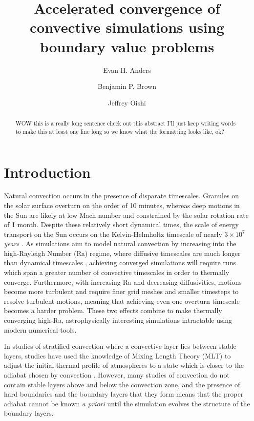 \documentclass[aps, pre, onecolumn, nofootinbib, notitlepage, groupedaddress, amsfonts, amssymb, amsmath, longbibliography]{revtex4-1}
\begin{document}
\author{Evan H. Anders}
\author{Benjamin P. Brown}
\author{Jeffrey Oishi}
\title{Accelerated convergence of convective simulations using boundary value problems}

\begin{abstract}
WOW this is a really long sentence check out this abstract I'll just keep writing words to make this at least
one line long so we know what the formatting looks like, ok?
\end{abstract}
\maketitle


\section{Introduction}
\label{sec:intro}
Natural convection occurs in the presence of disparate timescales. Granules on the
solar surface overturn on the order of 10 minutes, whereas deep motions in the Sun are likely at
low Mach number and constrained by the solar rotation rate of \~1 month.  
Despite these relatively short dynamical times, the scale of energy transport on the
Sun occurs on the Kelvin-Helmholtz timescale of nearly $3 \times 10^7$ \emph{years} \cite{stix2003}. 
As simulations aim to model natural convection
by increasing into the high-Rayleigh Number (Ra) regime, where diffusive timescales are much
longer than dynamical timescales \cite{Anders&Brown2017}, achieving converged simulations will 
require runs which span a greater number of convective timescales in order to thermally converge.
Furthermore, with increasing Ra and decreasing diffusivities, motions become more turbulent
and require finer grid meshes and smaller timesteps to resolve turbulent motions, meaning that
achieving even one overturn timescale becomes a harder problem.  
These two effects combine to make thermally converging high-Ra, astrophysically interesting
simulations intractable using modern numerical tools.

In studies of stratified convection where a convective layer lies between stable layers, studies
have used the knowledge of Mixing Length Theory (MLT) to adjust the initial thermal profile of
atmospheres to a state which is closer to the adiabat chosen by convection \cite{brandenburg&all2005}.
However, many studies of convection do not contain stable layers above and below the convection
zone, and the presence of hard boundaries and the boundary layers that they form means
that the proper adiabat cannot be known \emph{a priori} until the simulation evolves the
structure of the boundary layers.
\end{document}
